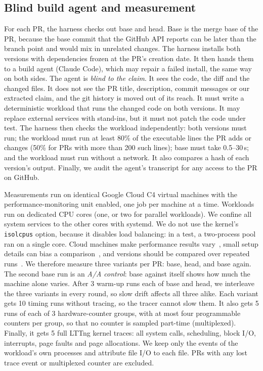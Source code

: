 \subsection{Blind build agent and measurement}
\label{sec:harness}
For each PR, the harness checks out base and head. Base is the merge base
of the PR, because the base commit that the GitHub API reports can be
later than the branch point and would mix in unrelated changes. The
harness installs both versions with dependencies frozen at the PR's
creation date. It then hands them to a build agent (Claude Code),
which may repair a failed install, the same way on both sides.
The agent is \emph{blind to the claim}. It sees the code, the diff and
the changed files. It does not see the PR title, description, commit
messages or our extracted claim, and the git history is moved out of its
reach. It must write a deterministic workload that runs the changed code
on both versions. It may replace external services with stand-ins, but it
must not patch the code under test. The harness then checks the workload
independently: both versions must run; the workload must run at least
80\% of the executable lines the PR adds or changes (50\% for PRs with
more than 200 such lines); base must take 0.5--30\,s; and the workload must
run without a network. It also compares a hash of each version's output.
Finally, we audit the agent's transcript for any access to the PR on
GitHub.

Measurements run on \nVMs identical Google Cloud C4 virtual machines with
the performance-monitoring unit enabled, one job per machine at a time.
Workloads run on dedicated CPU cores (one, or two for parallel
workloads). We confine all system services to the other cores with
systemd. We do not use the kernel's \texttt{isolcpus} option, because it
disables load balancing: in a test, a two-process pool ran on a single
core. Cloud machines make performance results vary~\cite{laaber2019cloud},
small setup details can bias a comparison~\cite{mytkowicz2009wrong}, and
versions should be compared over repeated runs~\cite{georges2007rigorous}.
We therefore measure three variants per PR: base, head, and base again.
The second base run is an \emph{A/A control}: base against itself shows
how much the machine alone varies. After 3 warm-up runs each of base and
head, we interleave the three variants in every round, so slow drift
affects all three alike. Each variant gets 10 timing runs without
tracing, so the tracer cannot slow them. It also gets 5 runs of each of 3
hardware-counter groups, with at most four programmable counters per
group, so that no counter is sampled part-time (multiplexed). Finally,
it gets 5 full LTTng kernel traces: all system calls, scheduling, block
I/O, interrupts, page faults and page allocations. We keep only the
events of the workload's own processes and attribute file I/O to each
file. PRs with any lost trace event or multiplexed counter are excluded.

